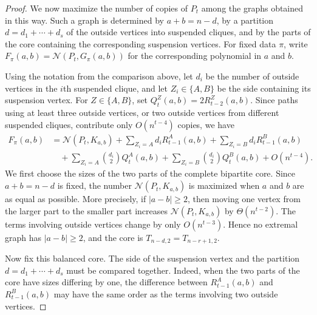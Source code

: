 \documentclass[10pt,a4paper]{amsart}
\newcommand{\N}{\mathcal N}
\begin{document}
\begin{proof}
We now maximize the number of copies of $P_t$ among the graphs obtained in this way. Such a graph is determined by $a+b=n-d$, by a partition $d=d_1+\cdots+d_s$ of the outside vertices into suspended cliques, and by the parts of the core containing the corresponding suspension vertices. For fixed data $\pi$, write $F_\pi(a,b)=\N(P_t,G_\pi(a,b))$ for the corresponding polynomial in $a$ and $b$.

Using the notation from the comparison above, let $d_i$ be the number of outside vertices in the $i$th suspended clique, and let $Z_i\in\{A,B\}$ be the side containing its suspension vertex. For $Z\in\{A,B\}$, set $Q_t^Z(a,b)=2R_{t-2}^Z(a,b)$. Since paths using at least three outside vertices, or two outside vertices from different suspended cliques, contribute only $O(n^{t-4})$ copies, we have
\[
\begin{aligned}
        F_\pi(a,b)
        &=\N(P_t,K_{a,b})
        +\sum_{Z_i=A} d_i R_{t-1}^A(a,b)
        +\sum_{Z_i=B} d_i R_{t-1}^B(a,b)\\
        &\quad
        +\sum_{Z_i=A}\binom{d_i}{2}Q_t^A(a,b)
        +\sum_{Z_i=B}\binom{d_i}{2}Q_t^B(a,b)
        +O(n^{t-4}).
\end{aligned}
\]
We first choose the sizes of the two parts of the complete bipartite core. Since $a+b=n-d$ is fixed, the number $\N(P_t,K_{a,b})$ is maximized when $a$ and $b$ are as equal as possible. More precisely, if $|a-b|\ge2$, then moving one vertex from the larger part to the smaller part increases $\N(P_t,K_{a,b})$ by $\Theta(n^{t-2})$. The terms involving outside vertices change by only $O(n^{t-3})$. Hence no extremal graph has $|a-b|\ge2$, and the core is $T_{n-d,2}=T_{n-r+1,2}$.

Now fix this balanced core. The side of the suspension vertex and the partition $d=d_1+\cdots+d_s$ must be compared together. Indeed, when the two parts of the core have sizes differing by one, the difference between $R_{t-1}^A(a,b)$ and $R_{t-1}^B(a,b)$ may have the same order as the terms involving two outside vertices.


\end{proof}
\end{document}
